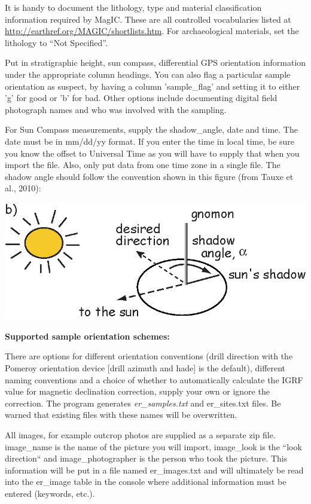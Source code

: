 \documentclass[11pt]{book}
\begin{document}
{   It is handy  to document the lithology, type and material classification information required by MagIC. These  are all controlled vocabularies listed at \url{http://earthref.org/MAGIC/shortlists.htm}.   For archaeological materials, set the lithology to ``Not Specified''.

   Put in stratigraphic height, sun compass, differential GPS orientation information under the appropriate column headings.  You can also flag a particular sample orientation as suspect, by having a column 'sample\_flag' and setting it to either 'g' for good or 'b' for bad.  Other options include documenting digital field photograph names and who was involved with the sampling.

 For Sun Compass measurements, supply the shadow\_angle, date and time. The date must be in mm/dd/yy format. If you enter the time in local time, be sure you know the offset to Universal Time as you will have to supply that when you import the file. Also, only put data from one time zone in a single file. The shadow angle should follow the convention shown in this figure (from Tauxe et al., 2010): \nocite{tauxe10}

  \includegraphics[width=15cm]{EPSfiles/suncomp.eps}


{\bf Supported sample orientation schemes:}

  There are options for
 different orientation conventions (drill direction with the Pomeroy orientation device  [drill azimuth and hade] is the default), different naming conventions and a choice of whether to automatically calculate the IGRF value for magnetic declination correction, supply your own or ignore the correction.  The program generates {\it er\_samples.txt} and {er\_sites.txt} files.  Be warned that existing files with these names will be overwritten.

 All images, for example outcrop photos are supplied as a separate zip file. image\_name is the name of the picture you will import, image\_look is the ``look direction`` and image\_photographer is the person who took the picture. This information will be put in a file named er\_images.txt and will ultimately be read into the er\_image table in the console where additional information must be entered (keywords, etc.).

}
\end{document}
